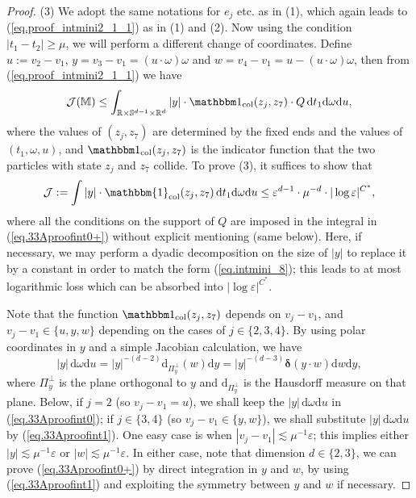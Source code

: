 \documentclass[10pt, reqno]{amsart}
\newcommand{\dirac}{\boldsymbol{\delta}}
\newcommand{\Mb}{\mathbb M}
\newcommand{\Rb}{\mathbb R}
\newcommand{\Sb}{\mathbb S}
\newcommand {\Jc}{\mathcal J}
\theoremstyle{definition}
\theoremstyle{remark}
\numberwithin{equation}{section}
\begin{document}
\begin{proof}
(3) We adopt the same notations for $e_j$ etc. as in (1), which again leads to (\ref{eq.proof_intmini2_1_1}) as in (1) and (2). Now using the condition $|t_1-t_2|\geq\mu$, we will perform a different change of coordinates. Define $u:=v_2-v_1$, $y=v_3-v_1=(u\cdot\omega)\omega$ and $w=v_4-v_1=u-(u\cdot\omega)\omega$, then from (\ref{eq.proof_intmini2_1_1}) we have
\begin{equation}\label{eq.33Aproofint0}
\Jc(\Mb)\leq\int_{\Rb\times \Sb^{d-1}\times \Rb^d} |y|\cdot \mathbbm 1_{\mathrm{col}}(z_j, z_7)\cdot  Q\,\mathrm{d}t_1\mathrm{d}\omega\mathrm{d}u,
\end{equation} where the values of $(z_j, z_7)$ are determined by the fixed ends and the values of $(t_1, \omega, u)$, and $\mathbbm 1_{\mathrm{col}}(z_j, z_7)$ is the indicator function that the two particles with state $z_j$ and $z_7$ collide. To prove (3), it suffices to show that 
\begin{equation}\label{eq.33Aproofint0+}
    \Jc:=\int |y|\cdot\mathbbm{1}_{\mathrm{col}}(z_j,z_7)\,\mathrm{d}t_1\mathrm{d}\omega\mathrm{d}u \le \varepsilon^{d-1}\cdot\mu^{-d}\cdot|\log\varepsilon|^{C^*},
\end{equation} where all the conditions on the support of $Q$ are imposed in the integral in (\ref{eq.33Aproofint0+}) without explicit mentioning (same below). Here, if necessary, we may perform a dyadic decomposition on the size of $|y|$ to replace it by a constant in order to match the form (\ref{eq.intmini_8}); this leads to at most logarithmic loss which can be absorbed into $|\log\varepsilon|^{C^*}$. 




Note that the function $\mathbbm 1_{\mathrm{col}}(z_j, z_7)$ depends on $v_j-v_1$, and $v_j-v_1\in\{u,y,w\}$ depending on the cases of $j\in\{2,3,4\}$. By using polar coordinates in $y$ and a simple Jacobian calculation, we have
\begin{equation}\label{eq.33Aproofint1}|y|\,\mathrm{d}\omega\mathrm{d}u=|y|^{-(d-2)} \mathrm{d}_{\Pi_y^\perp}(w) \mathrm{d}y=|y|^{-(d-3)}\dirac(y\cdot w) \mathrm{d}w \mathrm{d}y,\end{equation} where $\Pi_y^\perp$ is the plane orthogonal to $y$ and $\mathrm{d}_{\Pi_y^\perp}$ is the Hausdorff measure on that plane. Below, if $j=2$ (so $v_j-v_1=u$), we shall keep the $|y|\,\mathrm{d}\omega\mathrm{d}u$ in (\ref{eq.33Aproofint0}); if $j\in\{3,4\}$ (so $v_j-v_1\in\{y,w\}$), we shall substitute $|y|\,\mathrm{d}\omega\mathrm{d}u$ by (\ref{eq.33Aproofint1}). One easy case is when $|v_j-v_1|\lesssim\mu^{-1}\varepsilon$; this implies either $|y|\lesssim\mu^{-1}\varepsilon$ or $|w|\lesssim\mu^{-1}\varepsilon$. In either case, note that dimension $d\in\{2,3\}$, we can prove (\ref{eq.33Aproofint0+}) by direct integration in $y$ and $w$, by using (\ref{eq.33Aproofint1}) and exploiting the symmetry between $y$ and $w$ if necessary.


\end{proof}
\end{document}

